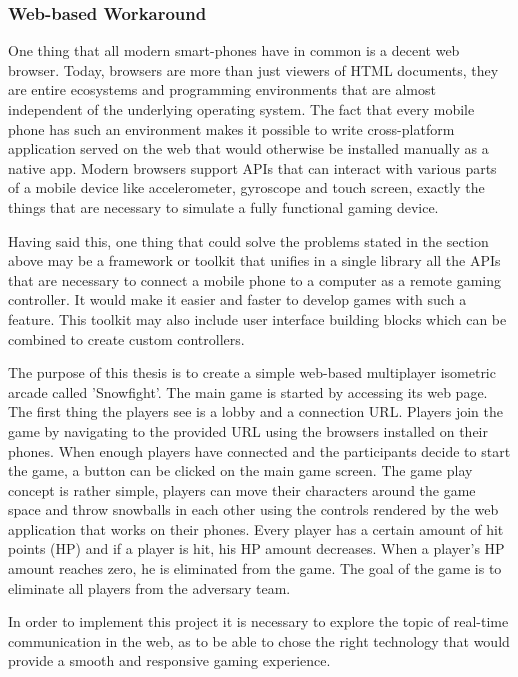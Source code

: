 \newpage

\subsubsection{Web-based Workaround}

One thing that all modern smart-phones have in common is a decent web browser.
Today, browsers are more than just viewers of HTML documents, they are entire
ecosystems and programming environments that are almost independent of the
underlying operating system. The fact that every mobile phone has such an
environment makes it possible to write cross-platform application served on
the web that would otherwise be installed manually as a native app. Modern
browsers support APIs that can interact with various parts of a mobile device
like accelerometer, gyroscope and touch screen, exactly the things that are
necessary to simulate a fully functional gaming device.

Having said this, one thing that could solve the problems stated in the
section above may be a framework or toolkit that unifies in a single library
all the APIs that are necessary to connect a mobile phone to a computer as a
remote gaming controller. It would make it easier and faster to develop games
with such a feature. This toolkit may also include user interface building
blocks which can be combined to create custom controllers.

The purpose of this thesis is to create a simple web-based multiplayer
isometric arcade called 'Snowfight'. The main game is started by accessing its
web page. The first thing the players see is a lobby and a connection URL.
Players join the game by navigating to the provided URL using the browsers
installed on their phones. When enough players have connected and the
participants decide to start the game, a button can be clicked on the main
game screen. The game play concept is rather simple, players can move their
characters around the game space and throw snowballs in each other using the
controls rendered by the web application that works on their phones. Every
player has a certain amount of hit points (HP) and if a player is hit, his HP
amount decreases. When a player's HP amount reaches zero, he is eliminated
from the game. The goal of the game is to eliminate all players from the
adversary team.

In order to implement this project it is necessary to explore the topic of
real-time communication in the web, as to be able to chose the right technology
that would provide a smooth and responsive gaming experience.


